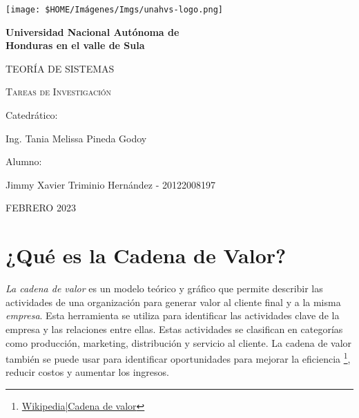 \documentclass[12pt]{article}
\begin{document}
\begin{titlepage}

  \begin{center}
    {\texttt{[image: \$HOME/Imágenes/Imgs/unahvs-logo.png]}\par}
  
    {\bfseries\Huge Universidad Nacional Autónoma de\\
                     Honduras en el valle de Sula \par}
  
    \vspace{1cm}
  
    {\scshape\huge TEORÍA DE SISTEMAS\par}
  
    \vspace{1cm}
  
    {\scshape\Large 
      Tareas de Investigación
    }
  
    \vfill 
    {\large Catedrático:\par} %
    {\large Ing. Tania Melissa Pineda Godoy\par} %
  
    \vfill
    {\large Alumno: \par}
    {\large Jimmy Xavier Triminio Hernández - 20122008197 \par}

    \vfill
    {\large FEBRERO 2023\par} %

  \end{center}

\end{titlepage}

\newpage
\tableofcontents

\section{¿Qué es la Cadena de Valor?}

  \textit{La cadena de valor} es un modelo teórico y gráfico que permite describir las
  actividades de una organización para generar valor al cliente final y a la misma
  \textit{empresa}. Esta herramienta se utiliza para identificar las actividades clave 
  de la empresa y las relaciones entre ellas. Estas actividades se clasifican en 
  categorías como producción, marketing, distribución y servicio al cliente. La cadena 
  de valor también se puede usar para identificar oportunidades para mejorar la 
  eficiencia \footnote{\href{https://es.wikipedia.org/wiki/Cadena_de_valor}{Wikipedia|Cadena de valor}}, reducir 
  costos y aumentar los ingresos.
  
\end{document}
